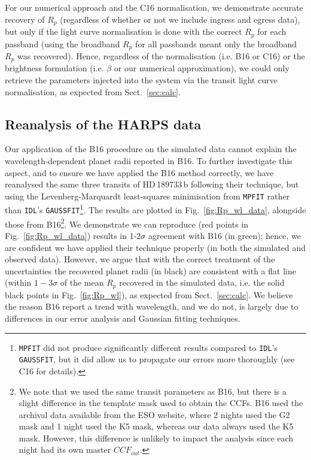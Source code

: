 \documentclass{aa}
\begin{document}
For our numerical approach and the C16 normalisation, we demonstrate accurate recovery of $R_p$ (regardless of whether or not we include ingress and egress data), but only if the light curve normalisation is done with the correct $R_p$ for each passband (using the broadband $R_p$ for all passbands meant only the broadband $R_p$ was recovered). Hence, regardless of the normalisation (i.e. B16 or C16) or the brightness formulation (i.e. $\beta$ or our numerical approximation), we could only retrieve the parameters injected into the system via the transit light curve normalisation, as expected from Sect.~\ref{sec:calc}.

\vspace{-10pt}
\subsection{Reanalysis of the HARPS data}
\label{sec:recover_data}
Our application of the B16 procedure on the simulated data cannot explain the wavelength-dependent planet radii reported in B16. To further investigate this aspect, and to ensure we have applied the B16 method correctly, we have reanalysed the same three transits of HD\,189733\,b following their technique, but using the Levenberg-Marquardt least-squares minimisation from \texttt{MPFIT} \citep[][and references therein]{markwardt09} rather than \texttt{IDL}'s \texttt{GAUSSFIT}\footnote{\texttt{MPFIT} did not produce significantly different results compared to \texttt{IDL}'s \texttt{GAUSSFIT}, but it did allow us to propagate our errors more thoroughly (see C16 for details).}. The results are plotted in Fig.~\ref{fig:Rp_wl_data}, alongside those from B16\footnote{We note that we used the same transit parameters as B16, but there is a slight difference in the template mask used to obtain the CCFs. B16 used the archival data available from the ESO website, where 2 nights used the G2 mask and 1 night used the K5 mask, whereas our data always used the K5 mask. However, this difference is unlikely to impact the analysis since each night had its own master $CCF_{out}$.}. We demonstrate we can reproduce (red points in Fig.~\ref{fig:Rp_wl_data}) results in 1-2$\sigma$ agreement with B16 (in green); hence, we are confident we have applied their technique properly (in both the simulated and observed data). However, we argue that with the correct treatment of the uncertainties the recovered planet radii (in black) are consistent with a flat line (within $1-3\sigma$ of the mean $R_p$ recovered in the simulated data, i.e. the solid black points in Fig.~\ref{fig:Rp_wl}), as expected from Sect.~\ref{sec:calc}. We believe the reason B16 report a trend with wavelength, and we do not, is largely due to differences in our error analysis and Gaussian fitting techniques. 
\end{document}
